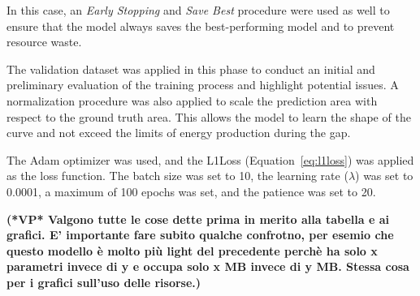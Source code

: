In this case, an \textit{Early Stopping} and \textit{Save Best} procedure were used %
as well to ensure that the model always saves the best-performing model and to prevent
resource waste.

The validation dataset was applied in this phase to conduct an initial
and preliminary evaluation of the training process and highlight potential issues.
A normalization procedure was also applied to scale the prediction area with respect
to the ground truth area.
This allows the model to learn the shape of the curve and not exceed the limits
of energy production during the gap.

The Adam optimizer was used, and the L1Loss (Equation~\ref{eq:l1loss}) was applied as the loss function.
The batch size was set to 10, the learning rate ($\lambda$) was set to 0.0001,
a maximum of 100 epochs was set, and the patience was set to 20.

	{\bf (*VP*
		Valgono tutte le cose dette prima in merito alla tabella e ai grafici. E' importante fare subito qualche confrotno, per esemio che questo modello è molto più light del precedente perchè ha solo x parametri invece di y e occupa solo x MB invece di y MB. Stessa cosa per i grafici sull'uso delle risorse.)}


